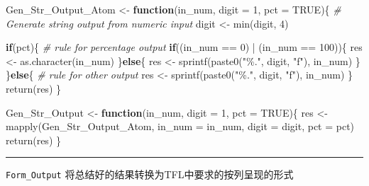 \documentclass[
]{ctexart}
\newenvironment{Shaded}{\begin{snugshade}}{\end{snugshade}}
\newcommand{\AttributeTok}[1]{\textcolor[rgb]{0.77,0.63,0.00}{#1}}
\newcommand{\CommentTok}[1]{\textcolor[rgb]{0.56,0.35,0.01}{\textit{#1}}}
\newcommand{\ConstantTok}[1]{\textcolor[rgb]{0.00,0.00,0.00}{#1}}
\newcommand{\ControlFlowTok}[1]{\textcolor[rgb]{0.13,0.29,0.53}{\textbf{#1}}}
\newcommand{\DecValTok}[1]{\textcolor[rgb]{0.00,0.00,0.81}{#1}}
\newcommand{\FunctionTok}[1]{\textcolor[rgb]{0.00,0.00,0.00}{#1}}
\newcommand{\NormalTok}[1]{#1}
\newcommand{\OtherTok}[1]{\textcolor[rgb]{0.56,0.35,0.01}{#1}}
\newcommand{\SpecialCharTok}[1]{\textcolor[rgb]{0.00,0.00,0.00}{#1}}
\newcommand{\StringTok}[1]{\textcolor[rgb]{0.31,0.60,0.02}{#1}}
\begin{document}
\begin{Shaded}
\begin{Highlighting}[]
\NormalTok{Gen\_Str\_Output\_Atom }\OtherTok{\textless{}{-}} \ControlFlowTok{function}\NormalTok{(in\_num, }\AttributeTok{digit =} \DecValTok{1}\NormalTok{, }\AttributeTok{pct =} \ConstantTok{TRUE}\NormalTok{)\{}
    \CommentTok{\# Generate string output from numeric input}
\NormalTok{    digit }\OtherTok{\textless{}{-}} \FunctionTok{min}\NormalTok{(digit, }\DecValTok{4}\NormalTok{)}
    
    \ControlFlowTok{if}\NormalTok{(pct)\{ }\CommentTok{\# rule for \textasciigrave{}percentage\textasciigrave{} output}
        \ControlFlowTok{if}\NormalTok{((in\_num }\SpecialCharTok{==} \DecValTok{0}\NormalTok{) }\SpecialCharTok{|}\NormalTok{ (in\_num }\SpecialCharTok{==} \DecValTok{100}\NormalTok{))\{}
\NormalTok{            res }\OtherTok{\textless{}{-}} \FunctionTok{as.character}\NormalTok{(in\_num)}
\NormalTok{        \}}\ControlFlowTok{else}\NormalTok{\{}
\NormalTok{            res }\OtherTok{\textless{}{-}} \FunctionTok{sprintf}\NormalTok{(}\FunctionTok{paste0}\NormalTok{(}\StringTok{"\%."}\NormalTok{, digit, }\StringTok{"f"}\NormalTok{), in\_num)}
\NormalTok{        \}}
\NormalTok{    \}}\ControlFlowTok{else}\NormalTok{\{ }\CommentTok{\# rule for other output}
\NormalTok{        res }\OtherTok{\textless{}{-}} \FunctionTok{sprintf}\NormalTok{(}\FunctionTok{paste0}\NormalTok{(}\StringTok{"\%."}\NormalTok{, digit, }\StringTok{"f"}\NormalTok{), in\_num)}
\NormalTok{    \}}
    \FunctionTok{return}\NormalTok{(res)}
\NormalTok{\}}

\NormalTok{Gen\_Str\_Output }\OtherTok{\textless{}{-}} \ControlFlowTok{function}\NormalTok{(in\_num, }\AttributeTok{digit =} \DecValTok{1}\NormalTok{, }\AttributeTok{pct =} \ConstantTok{TRUE}\NormalTok{)\{}
\NormalTok{    res }\OtherTok{\textless{}{-}} \FunctionTok{mapply}\NormalTok{(Gen\_Str\_Output\_Atom, }\AttributeTok{in\_num =}\NormalTok{ in\_num, }\AttributeTok{digit =}\NormalTok{ digit, }\AttributeTok{pct =}\NormalTok{ pct)}
    \FunctionTok{return}\NormalTok{(res)}
\NormalTok{\}}
\end{Highlighting}
\end{Shaded}

\begin{center}\rule{0.5\linewidth}{0.5pt}\end{center}

\texttt{Form\_Output} 将总结好的结果转换为TFL中要求的按列呈现的形式
\end{document}
